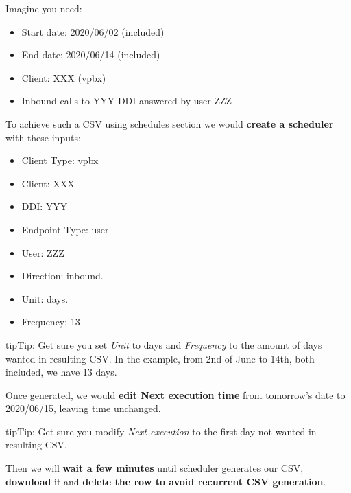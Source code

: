 \documentclass[letterpaper,10pt,english]{sphinxmanual}
\begin{document}
Imagine you need:
\begin{itemize}
\item {} 
Start date: 2020/06/02 (included)

\item {} 
End date: 2020/06/14 (included)

\item {} 
Client: XXX (vpbx)

\item {} 
Inbound calls to YYY DDI answered by user ZZZ

\end{itemize}

To achieve such a CSV using schedules section we would \textbf{create a scheduler} with these inputs:
\begin{itemize}
\item {} 
Client Type: vpbx

\item {} 
Client: XXX

\item {} 
DDI: YYY

\item {} 
Endpoint Type: user

\item {} 
User: ZZZ

\item {} 
Direction: inbound.

\item {} 
Unit: days.

\item {} 
Frequency: 13

\end{itemize}

\begin{notice}{tip}{Tip:}
Get sure you set \emph{Unit} to days and \emph{Frequency} to the amount of days wanted in resulting CSV. In the example,
from 2nd of June to 14th, both included, we have 13 days.
\end{notice}

Once generated, we would \textbf{edit Next execution time} from tomorrow's date to 2020/06/15, leaving time unchanged.

\begin{notice}{tip}{Tip:}
Get sure you modify \emph{Next execution} to the first day not wanted in resulting CSV.
\end{notice}

Then we will \textbf{wait a few minutes} until scheduler generates our CSV, \textbf{download} it and \textbf{delete the row to avoid recurrent
CSV generation}.
\end{document}
